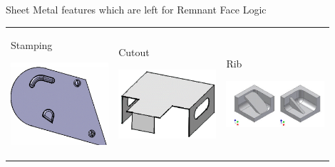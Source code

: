 \begin{frame}{Sheet Metal features which are left for Remnant Face Logic}
\begin{tabular}[h]{@{} p{0.3\linewidth} p{0.3\linewidth} p{0.3\linewidth}@{}}
Stamping

\includegraphics[width=0.9\linewidth]{..//Common/images/Feature_Stamping.png} &

Cutout

\includegraphics[width=0.6\linewidth]{..//Common/images/Feature_Cutout.png} &

Rib

\includegraphics[width=0.9\linewidth]{..//Common/images/Feature_Rib.png} \\

\end{tabular}
\end{frame}

